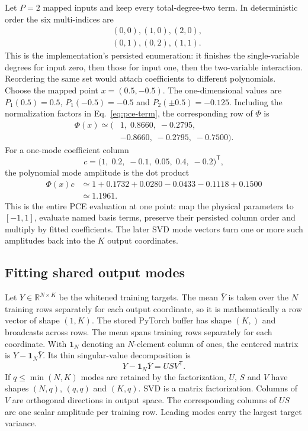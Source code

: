 \documentclass[10pt,aps,prd,twocolumn,nofootinbib]{revtex4-2}
\begin{document}
Let $P=2$ mapped inputs and keep every total-degree-two term.  In deterministic
order the six multi-indices are
\begin{equation*}
\begin{aligned}
 &(0,0),(1,0),(2,0),\\
 &(0,1),(0,2),(1,1).
\end{aligned}
\end{equation*}
This is the implementation's persisted enumeration: it finishes the
single-variable degrees for input zero, then those for input one, then the
two-variable interaction.  Reordering the same set would attach coefficients
to different polynomials.
Choose the mapped point $x=(0.5,-0.5)$.  The one-dimensional values are
$P_1(0.5)=0.5$, $P_1(-0.5)=-0.5$ and
$P_2(\pm0.5)=-0.125$.  Including the normalization factors in
Eq.~\eqref{eq:pce-term}, the corresponding row of $\Phi$ is
\begin{equation*}
\begin{aligned}
 \Phi(x)\simeq(&1,\;0.8660,\;-0.2795,\\
                &-0.8660,\;-0.2795,\;-0.7500).
\end{aligned}
\end{equation*}
For a one-mode coefficient column
\begin{equation*}
 c=\bigl(1,\;0.2,\;-0.1,\;0.05,
          \;0.4,\;-0.2\bigr)^{\mathsf T},
\end{equation*}
the polynomial mode amplitude is the dot product
\begin{align*}
 \Phi(x)c
 &\simeq 1+0.1732+0.0280-0.0433-0.1118+0.1500\\
 &\simeq 1.1961.
\end{align*}
This is the entire PCE evaluation at one point: map the physical parameters to
$[-1,1]$, evaluate named basis terms, preserve their persisted column order
and multiply by fitted coefficients.  The later SVD mode vectors turn one or
more such amplitudes back into the $K$ output coordinates.

\subsection{Fitting shared output modes}

Let \(Y\in\mathbb{R}^{N\times K}\) be the whitened training targets.  The
mean $\bar Y$ is taken over the $N$ training rows separately for each output
coordinate, so it is mathematically a row vector of shape $(1,K)$.  The stored
PyTorch buffer has shape $(K,)$ and broadcasts across rows.  The mean spans
training rows separately for each coordinate.  With $\mathbf 1_N$ denoting an
$N$-element column of ones,
the centered matrix is $Y-\mathbf 1_N\bar Y$.  Its thin singular-value
decomposition is
\begin{equation*}
 Y-\mathbf 1_N\bar Y=USV^{\mathsf T}.
\end{equation*}
If $q\le\min(N,K)$ modes are retained by the factorization, $U$, $S$ and
$V$ have shapes $(N,q)$, $(q,q)$ and $(K,q)$.  SVD is a matrix
factorization.  Columns of \(V\) are orthogonal directions in output space.
The corresponding columns of \(US\) are one scalar amplitude per training
row.  Leading modes carry the largest target variance.
\end{document}

